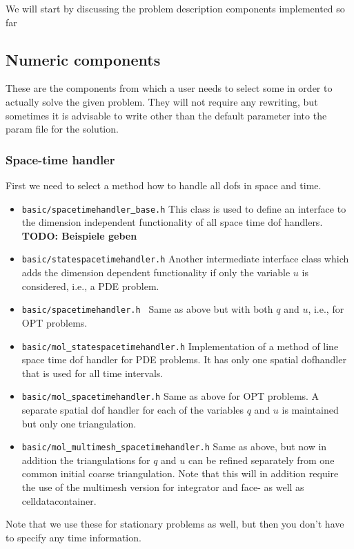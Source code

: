 \documentclass[prodmode,acmtoms]{acmsmall}
\numberwithin{equation}{section}
\begin{document}
We will start by discussing the problem description components implemented so far


\subsection{Numeric components}
These are the components from which a user needs to select some in order to actually 
solve the given problem. They will not require any rewriting, but sometimes it is 
advisable to write other than the default parameter into the param file for the 
solution.

\subsubsection{Space-time handler}
First we need to select a method how to handle all dofs in space and time.
\begin{itemize}
\item \texttt{basic/spacetimehandler\underline{ }base.h} This class is used to define 
  an interface to the dimension independent functionality of all space time dof handlers.
  {\bf TODO: Beispiele geben}
\item \texttt{basic/statespacetimehandler.h} Another intermediate interface class which adds 
  the dimension dependent functionality if only the variable $u$ is considered, i.e., a 
  PDE problem.
\item \texttt{basic/spacetimehandler.h } Same as above but with both $q$ and $u$, i.e., for
  OPT problems.
\item \texttt{basic/mol\underline{ }statespacetimehandler.h} Implementation of a method of 
  line space time dof handler for PDE problems. It has only one spatial 
  dofhandler that is used for all time intervals.
\item \texttt{basic/mol\underline{ }spacetimehandler.h} Same as above for OPT problems.
  A separate spatial dof handler for each of the variables $q$ and $u$ is maintained 
  but only one triangulation.
\item \texttt{basic/mol\underline{ }multimesh\underline{ }spacetimehandler.h}
  Same as above, but now in addition the triangulations for $q$ and $u$ can be refined
  separately from one common initial coarse triangulation. Note that this will
  in addition require the use of the multimesh version for integrator and 
  face- as well as celldatacontainer.
\end{itemize}
Note that we use these for stationary problems as well, but then you don't have to specify
any time information.
\end{document}

